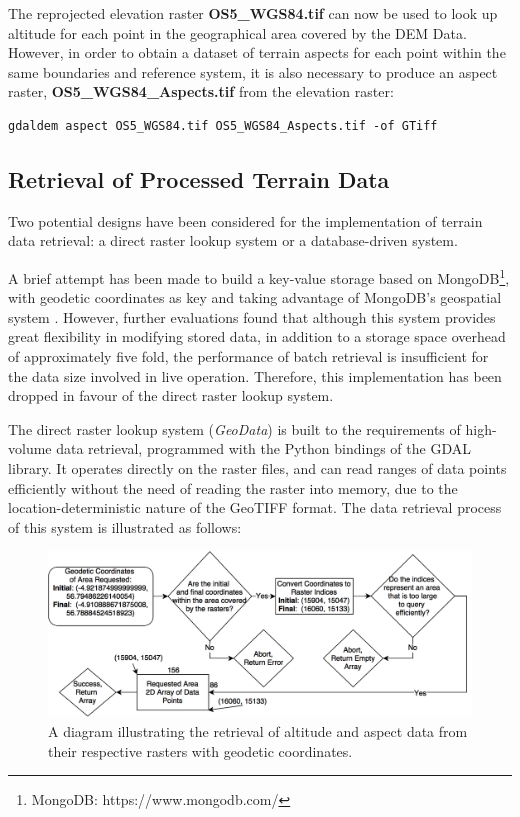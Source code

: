 \documentclass[11pt, oneside]{article}
\begin{document}
		The reprojected elevation raster \textbf{OS5\_WGS84.tif} can now be used to look up altitude for each point in the geographical area covered by the DEM Data. However, in order to obtain a dataset of terrain aspects for each point within the same boundaries and reference system, it is also necessary to produce an aspect raster, \textbf{OS5\_WGS84\_Aspects.tif} from the elevation raster:
		\begin{lstlisting}[breaklines]
gdaldem aspect OS5_WGS84.tif OS5_WGS84_Aspects.tif -of GTiff
		\end{lstlisting}
		
	\subsection{Retrieval of Processed Terrain Data} \label{subsec:rasterretrieval}
		Two potential designs have been considered for the implementation of terrain data retrieval: a direct raster lookup system or a database-driven system. 
		
		A brief attempt has been made to build a key-value storage based on MongoDB\footnote{MongoDB: https://www.mongodb.com/}, with geodetic coordinates as key and taking advantage of MongoDB's geospatial system \cite{mongodb-spatial}. However, further evaluations found that although this system provides great flexibility in modifying stored data, in addition to a storage space overhead of approximately five fold, the performance of batch retrieval is insufficient for the data size involved in live operation. Therefore, this implementation has been dropped in favour of the direct raster lookup system.
		
		The direct raster lookup system (\textit{GeoData}) is built to the requirements of high-volume data retrieval, programmed with the Python bindings of the GDAL library. It operates directly on the raster files, and can read ranges of data points efficiently without the need of reading the raster into memory, due to the location-deterministic nature of the GeoTIFF format.  The data retrieval process of this system is illustrated as follows:
		\begin{figure}[h]
		\centering
		\includegraphics[scale=0.3]{Retrieval.png}
		\caption{\label{fig:retrieval}A diagram illustrating the retrieval of altitude and aspect data from their respective rasters with geodetic coordinates.}
		\end{figure}
		
\end{document}
